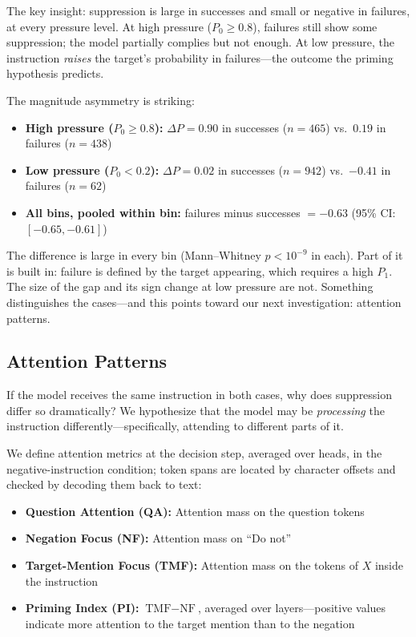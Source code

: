 \documentclass{article}
\begin{document}
The key insight: suppression is large in successes and small or negative in failures, at every pressure level. At high pressure ($P_0 \geq 0.8$), failures still show some suppression; the model partially complies but not enough. At low pressure, the instruction \emph{raises} the target's probability in failures---the outcome the priming hypothesis predicts.

The magnitude asymmetry is striking:
\begin{itemize}
    \item \textbf{High pressure ($P_0 \geq 0.8$):} $\Delta P = 0.90$ in successes ($n=465$) vs.\ $0.19$ in failures ($n=438$)
    \item \textbf{Low pressure ($P_0 < 0.2$):} $\Delta P = 0.02$ in successes ($n=942$) vs.\ $-0.41$ in failures ($n=62$)
    \item \textbf{All bins, pooled within bin:} failures minus successes $= -0.63$ (95\% CI: $[-0.65, -0.61]$)
\end{itemize}

The difference is large in every bin (Mann--Whitney $p < 10^{-9}$ in each). Part of it is built in: failure is defined by the target appearing, which requires a high $P_1$. The size of the gap and its sign change at low pressure are not. Something distinguishes the cases---and this points toward our next investigation: attention patterns.

\subsection{Attention Patterns}

If the model receives the same instruction in both cases, why does suppression differ so dramatically? We hypothesize that the model may be \emph{processing} the instruction differently---specifically, attending to different parts of it.

We define attention metrics at the decision step, averaged over heads, in the negative-instruction condition; token spans are located by character offsets and checked by decoding them back to text:
\begin{itemize}
    \item \textbf{Question Attention (QA):} Attention mass on the question tokens
    \item \textbf{Negation Focus (NF):} Attention mass on ``Do not''
    \item \textbf{Target-Mention Focus (TMF):} Attention mass on the tokens of $X$ inside the instruction
    \item \textbf{Priming Index (PI):} $\text{TMF} - \text{NF}$, averaged over layers---positive values indicate more attention to the target mention than to the negation
\end{itemize}
\end{document}
